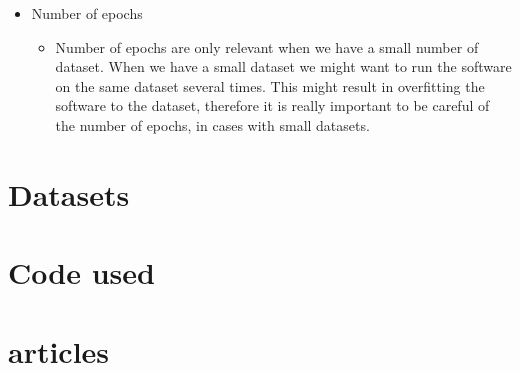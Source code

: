 \documentclass[Report.tex]{subfiles}
\begin{document}
\begin{flushleft}
\begin{itemize}
\begin{itemize}
     \end{itemize}
     \item{Number of epochs}
     \begin{itemize}
      \item{Number of epochs are only relevant when we have a small number of dataset. When we have a small dataset we might want to run the software on the same dataset several times. This might result in overfitting the software to the dataset, therefore it is really important to be careful of the number of epochs, in cases with small datasets.}
     \end{itemize}
    \end{itemize}
  \end{flushleft}


\section{Datasets}
\section{Code used}
\section{articles}

\end{document}
